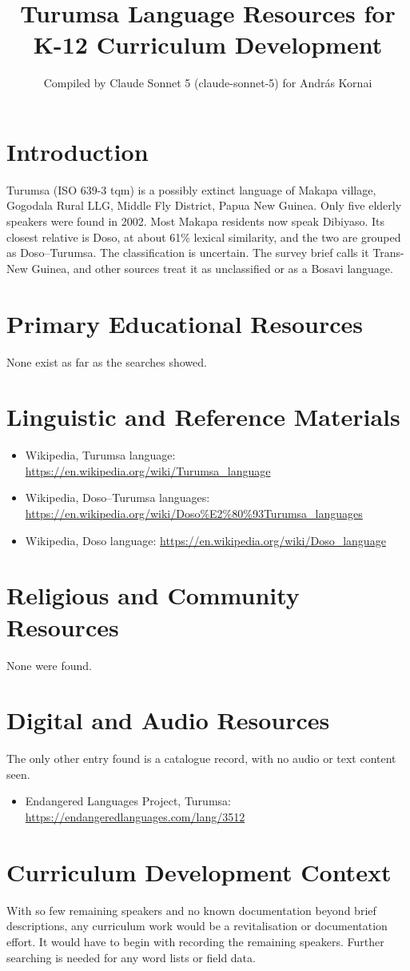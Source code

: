 \documentclass[12pt]{article}
\title{Turumsa Language Resources for K-12 Curriculum Development}
\author{Compiled by Claude Sonnet 5 (claude-sonnet-5) for Andr\'as Kornai}
\date{}
\begin{document}
\maketitle

\section{Introduction}
Turumsa (ISO 639-3 tqm) is a possibly extinct language of Makapa village, Gogodala Rural LLG, Middle Fly District, Papua New Guinea. Only five elderly speakers were found in 2002. Most Makapa residents now speak Dibiyaso. Its closest relative is Doso, at about 61\% lexical similarity, and the two are grouped as Doso--Turumsa. The classification is uncertain. The survey brief calls it Trans-New Guinea, and other sources treat it as unclassified or as a Bosavi language.

\section{Primary Educational Resources}
None exist as far as the searches showed.

\section{Linguistic and Reference Materials}
\begin{itemize}
\item Wikipedia, Turumsa language: \url{https://en.wikipedia.org/wiki/Turumsa_language}
\item Wikipedia, Doso--Turumsa languages: \url{https://en.wikipedia.org/wiki/Doso%E2%80%93Turumsa_languages}
\item Wikipedia, Doso language: \url{https://en.wikipedia.org/wiki/Doso_language}
\end{itemize}

\section{Religious and Community Resources}
None were found.

\section{Digital and Audio Resources}
The only other entry found is a catalogue record, with no audio or text content seen.
\begin{itemize}
\item Endangered Languages Project, Turumsa: \url{https://endangeredlanguages.com/lang/3512}
\end{itemize}

\section{Curriculum Development Context}
With so few remaining speakers and no known documentation beyond brief descriptions, any curriculum work would be a revitalisation or documentation effort. It would have to begin with recording the remaining speakers. Further searching is needed for any word lists or field data.
\end{document}
